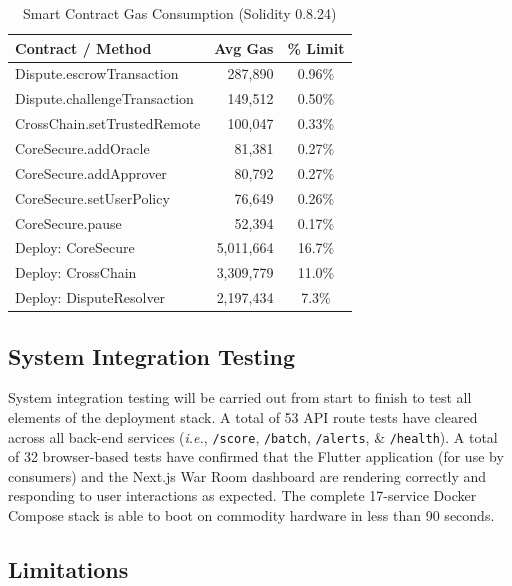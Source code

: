 \documentclass[journal]{IEEEtran}
\newcommand{\ie}{\textit{i.e.}}
\begin{document}
\begin{table}[!t]
\centering
\caption{Smart Contract Gas Consumption (Solidity 0.8.24)}
\label{tab:gas}
\begin{tabular}{lrc}
\toprule
\textbf{Contract / Method} & \textbf{Avg Gas} & \textbf{\% Limit} \\
\midrule
Dispute.escrowTransaction & 287,890 & 0.96\% \\
Dispute.challengeTransaction & 149,512 & 0.50\% \\
CrossChain.setTrustedRemote & 100,047 & 0.33\% \\
CoreSecure.addOracle & 81,381 & 0.27\% \\
CoreSecure.addApprover & 80,792 & 0.27\% \\
CoreSecure.setUserPolicy & 76,649 & 0.26\% \\
CoreSecure.pause & 52,394 & 0.17\% \\
Deploy: CoreSecure & 5,011,664 & 16.7\% \\
Deploy: CrossChain & 3,309,779 & 11.0\% \\
Deploy: DisputeResolver & 2,197,434 & 7.3\% \\
\bottomrule
\end{tabular}
\end{table}

\subsection{System Integration Testing}

System integration testing will be carried out from start to finish to test all elements of the deployment stack. A total of 53 API route tests have cleared across all back-end services (\ie, \texttt{/score}, \texttt{/batch}, \texttt{/alerts}, \& \texttt{/health}). A total of 32 browser-based tests have confirmed that the Flutter application (for use by consumers) and the Next.js War Room dashboard are rendering correctly and responding to user interactions as expected. The complete 17-service Docker Compose stack is able to boot on commodity hardware in less than 90 seconds.

\subsection{Limitations}
\end{document}
